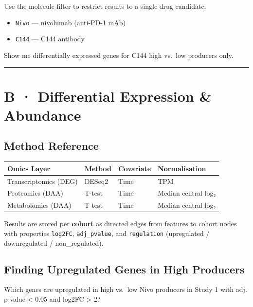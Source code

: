 \documentclass[
  letterpaper,
  oneside,
  open=any]{scrbook}
\newcounter{none} %
\providecommand{\tightlist}{%
  \setlength{\itemsep}{0pt}\setlength{\parskip}{0pt}}
\begin{document}
Use the molecule filter to restrict results to a single drug candidate:

\begin{itemize}
\tightlist
\item
  \texttt{Nivo} --- nivolumab (anti-PD-1 mAb)
\item
  \texttt{C144} --- C144 antibody
\end{itemize}

Show me differentially expressed genes for C144 high vs.~low producers
only.

\begin{center}\rule{0.5\linewidth}{0.5pt}\end{center}

\section{B · Differential Expression \& Abundance}\label{sec-deg}

\subsection{Method Reference}\label{method-reference}

{\def\LTcaptype{none} %
\begin{longtable}[]{@{}llll@{}}
\toprule\noalign{}
Omics Layer & Method & Covariate & Normalisation \\
\midrule\noalign{}
\endhead
\bottomrule\noalign{}
\endlastfoot
Transcriptomics (DEG) & DESeq2 & Time & TPM \\
Proteomics (DAA) & T-test & Time & Median central log₂ \\
Metabolomics (DAA) & T-test & Time & Median central log₂ \\
\end{longtable}
}

Results are stored per \textbf{cohort} as directed edges from features
to cohort nodes with properties \texttt{log2FC}, \texttt{adj\_pvalue},
and \texttt{regulation} (upregulated / downregulated / non\_regulated).

\subsection{Finding Upregulated Genes in High
Producers}\label{finding-upregulated-genes-in-high-producers}

Which genes are upregulated in high vs.~low Nivo producers in Study 1
with adj. p-value \textless{} 0.05 and \textbar log2FC\textbar{}
\textgreater{} 2?
\end{document}
